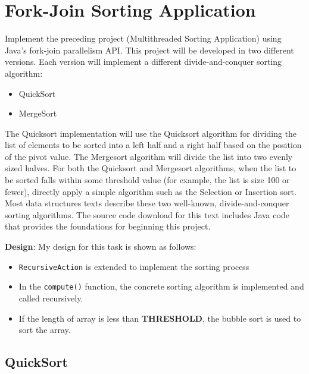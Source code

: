 \documentclass[UTF8,10pt,a4paper]{article}
\theoremstyle{Problem}
\theoremstyle{Solution}
\begin{document}
\section{Fork-Join Sorting Application}

Implement the preceding project (Multithreaded Sorting Application) using
Java’s fork-join parallelism API. This project will be developed in two different versions. Each version will implement a different divide-and-conquer sorting algorithm:
\begin{itemize}
    \item QuickSort
    \item MergeSort
\end{itemize}

The Quicksort implementation will use the Quicksort algorithm for dividing
the list of elements to be sorted into a left half and a right half based on the position of the pivot value. The Mergesort algorithm will divide the list into two evenly sized halves. For both the Quicksort and Mergesort algorithms,
when the list to be sorted falls within some threshold value (for example, the
list is size 100 or fewer), directly apply a simple algorithm such as the Selection or Insertion sort. Most data structures texts describe these two well-known, divide-and-conquer sorting algorithms.  The source code download for this text includes Java code that provides the foundations for beginning this project.

\textbf{Design}: My design for this task is shown as follows:

\begin{itemize}
    \item \texttt{RecursiveAction} is extended to implement the sorting process
    \item In the \texttt{compute()} function, the concrete sorting algorithm is implemented and called recursively.
    \item If the length of array is less than \textbf{THRESHOLD}, the bubble sort is used to sort the array.
\end{itemize}

\subsection{QuickSort}
\end{document}
